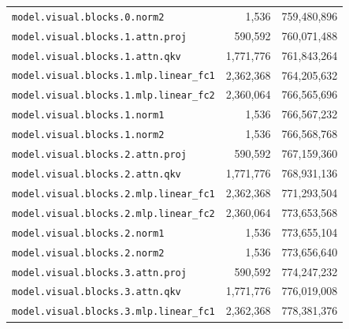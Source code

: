 \documentclass[10pt,a4paper]{article}
\theoremstyle{definition}
\begin{document}
\begin{appendices}
\begin{longtable}{p{9.5cm}rr}
\texttt{model.\allowbreak{}visual.\allowbreak{}blocks.\allowbreak{}0.\allowbreak{}norm2} & 1,536 & 759,480,896 \\
\texttt{model.\allowbreak{}visual.\allowbreak{}blocks.\allowbreak{}1.\allowbreak{}attn.\allowbreak{}proj} & 590,592 & 760,071,488 \\
\texttt{model.\allowbreak{}visual.\allowbreak{}blocks.\allowbreak{}1.\allowbreak{}attn.\allowbreak{}qkv} & 1,771,776 & 761,843,264 \\
\texttt{model.\allowbreak{}visual.\allowbreak{}blocks.\allowbreak{}1.\allowbreak{}mlp.\allowbreak{}linear\_fc1} & 2,362,368 & 764,205,632 \\
\texttt{model.\allowbreak{}visual.\allowbreak{}blocks.\allowbreak{}1.\allowbreak{}mlp.\allowbreak{}linear\_fc2} & 2,360,064 & 766,565,696 \\
\texttt{model.\allowbreak{}visual.\allowbreak{}blocks.\allowbreak{}1.\allowbreak{}norm1} & 1,536 & 766,567,232 \\
\texttt{model.\allowbreak{}visual.\allowbreak{}blocks.\allowbreak{}1.\allowbreak{}norm2} & 1,536 & 766,568,768 \\
\texttt{model.\allowbreak{}visual.\allowbreak{}blocks.\allowbreak{}2.\allowbreak{}attn.\allowbreak{}proj} & 590,592 & 767,159,360 \\
\texttt{model.\allowbreak{}visual.\allowbreak{}blocks.\allowbreak{}2.\allowbreak{}attn.\allowbreak{}qkv} & 1,771,776 & 768,931,136 \\
\texttt{model.\allowbreak{}visual.\allowbreak{}blocks.\allowbreak{}2.\allowbreak{}mlp.\allowbreak{}linear\_fc1} & 2,362,368 & 771,293,504 \\
\texttt{model.\allowbreak{}visual.\allowbreak{}blocks.\allowbreak{}2.\allowbreak{}mlp.\allowbreak{}linear\_fc2} & 2,360,064 & 773,653,568 \\
\texttt{model.\allowbreak{}visual.\allowbreak{}blocks.\allowbreak{}2.\allowbreak{}norm1} & 1,536 & 773,655,104 \\
\texttt{model.\allowbreak{}visual.\allowbreak{}blocks.\allowbreak{}2.\allowbreak{}norm2} & 1,536 & 773,656,640 \\
\texttt{model.\allowbreak{}visual.\allowbreak{}blocks.\allowbreak{}3.\allowbreak{}attn.\allowbreak{}proj} & 590,592 & 774,247,232 \\
\texttt{model.\allowbreak{}visual.\allowbreak{}blocks.\allowbreak{}3.\allowbreak{}attn.\allowbreak{}qkv} & 1,771,776 & 776,019,008 \\
\texttt{model.\allowbreak{}visual.\allowbreak{}blocks.\allowbreak{}3.\allowbreak{}mlp.\allowbreak{}linear\_fc1} & 2,362,368 & 778,381,376 \\

\end{longtable}
\end{appendices}
\end{document}
